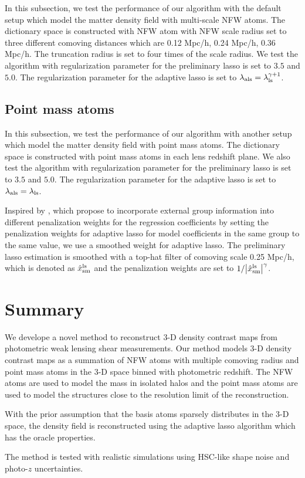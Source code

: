 \documentclass[twocolumn]{aastex62}
\begin{document}
In this subsection, we test the performance of our algorithm with the default setup which model the matter density
field with multi-scale NFW atoms. The dictionary space is constructed with NFW atom with NFW scale radius set to
three different comoving distances which are 0.12 Mpc/h, 0.24 Mpc/h, 0.36 Mpc/h. The truncation radius is set to
four times of the scale radius.
We test the algorithm with regularization parameter for the preliminary lasso is set to $3.5$ and $5.0$. The 
regularization parameter for the adaptive lasso is set to $\lambda_{\rm{als}}=\lambda_{\rm{ls}}^{\gamma+1}$.

\subsection{Point mass atoms}
\label{subsec:test-pm}
In this subsection, we test the performance of our algorithm with another setup which model the matter density
field with point mass atoms.
The dictionary space is constructed with point mass atoms in each lens redshift plane.
We also test the algorithm with regularization parameter for the preliminary lasso is set to $3.5$ and $5.0$. The 
regularization parameter for the adaptive lasso is set to $\lambda_{\rm{als}}=\lambda_{\rm{ls}}$.

Inspired by \citet{structureAdaLasso-Pramanik2020}, which propose to incorporate external group information into 
different penalization weights for the regression coefficients by setting the penalization weights for adaptive lasso
for model coefficients in the same group to the same value, we use a smoothed weight for adaptive lasso. The preliminary
lasso estimation is smoothed with a top-hat filter of comoving scale 0.25 Mpc/h, which is denoted as 
$\hat{x}^{\rm{ls}}_{\rm{sm}}$ and the penalization weights are set to $1/\abs{\hat{x}^{\rm{ls}}_{\rm{sm}}}^\gamma$.



\section{Summary}
\label{sec:Sum}

We develope a novel method to reconstruct $3$-D density contrast maps from photometric weak lensing shear measurements.
Our method models $3$-D density contrast maps as a summation of NFW atoms with multiple comoving radius and point mass atoms
in the $3$-D space binned with photometric redshift. The NFW atoms are used to model the mass in isolated halos and the 
point mass atoms are used to model the structures close to the resolution limit of the reconstruction. 

With the prior assumption that the basis atoms sparsely distributes in the $3$-D space, the density field is reconstructed 
using the adaptive lasso algorithm \citep{AdaLASSO-Zou2006} which has the oracle properties. 


The method is tested with realistic simulations using HSC-like shape noise and photo-$z$ uncertainties.





\appendix
\end{document}
